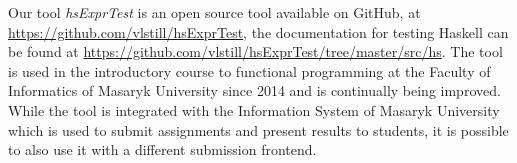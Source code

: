 \documentclass[sigconf,screen]{acmart} %
\newcommand{\hsExprTest}{\textit{hsExprTest}}
\begin{document}
Our tool \hsExprTest{} is an open source tool available on GitHub,
at \url{https://github.com/vlstill/hsExprTest}, the documentation for testing
Haskell can be found at
\url{https://github.com/vlstill/hsExprTest/tree/master/src/hs}.
The tool is used in the introductory course to functional programming at the
Faculty of Informatics of Masaryk University since 2014 and is continually
being improved.
While the tool is integrated with the Information System of Masaryk University
which is used to submit assignments and present results to students, it is
possible to also use it with a different submission frontend.


\balance


\end{document}
